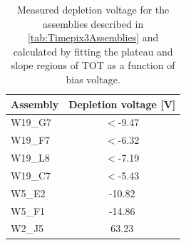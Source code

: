 \begin{table}[htbp]
  \centering
  \caption{Measured depletion voltage for the assemblies described in
    \cref{tab:Timepix3Assemblies} and calculated by fitting the
    plateau and slope regions of TOT as a function of bias voltage.}
  \label{tab:depletionVoltage}
  \begin{tabular}{lc}
    \toprule
    Assembly & Depletion voltage [V] \\
    \midrule
    W19\_G7 & $<$-9.47 \\
    W19\_F7 & $<$-6.32 \\
    W19\_L8 & $<$-7.19\\
    W19\_C7 & $<$-5.43\\ \hline
    W5\_E2 & -10.82 \\ \hline
    W5\_F1 & -14.86 \\ \hline
    W2\_J5 & 63.23 \\ 
    \bottomrule
  \end{tabular}
\end{table}



